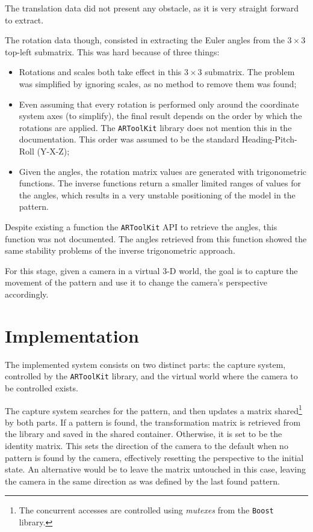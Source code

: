 \documentclass{acmtog}
\begin{document}
The translation data did not present any obstacle, as it is very straight forward to extract.

The rotation data though, consisted in extracting the Euler angles from the $3 \times 3$ top-left submatrix. This was hard because of three things:
\begin{itemize}
\item{Rotations and scales both take effect in this $3 \times 3$ submatrix. The problem was simplified by ignoring scales, as no method to remove them was found;}
\item{Even assuming that every rotation is performed only around the coordinate system axes (to simplify), the final result depends on the order by which the rotations are applied. The \texttt{ARToolKit} library does not mention this in the documentation. This order was assumed to be the standard Heading-Pitch-Roll (Y-X-Z);}
\item{Given the angles, the rotation matrix values are generated with trigonometric functions. The inverse functions return a smaller limited ranges of values for the angles, which results in a very unstable positioning of the model in the pattern.}
\end{itemize}
Despite existing a function the \texttt{ARToolKit} API to retrieve the angles, this function was not documented. The angles retrieved from this function showed the same stability problems of the inverse trigonometric approach.

For this stage, given a camera in a virtual 3-D world, the goal is to capture the movement of the pattern and use it to change the camera's perspective accordingly.

\section{Implementation}
The implemented system consists on two distinct parts: the capture system, controlled by the \texttt{ARToolKit} library, and the virtual world where the camera to be controlled exists.

The capture system searches for the pattern, and then updates a matrix shared\footnote{The concurrent accesses are controlled using \textit{mutexes} from the \texttt{Boost} library.} by both parts. If a pattern is found, the transformation matrix is retrieved from the library and saved in the shared container. Otherwise, it is set to be the identity matrix. This sets the direction of the camera to the default when no pattern is found by the camera, effectively resetting the perspective to the initial state. An alternative would be to leave the matrix untouched in this case, leaving the camera in the same direction as was defined by the last found  pattern.
\end{document}
